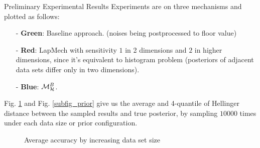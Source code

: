 \documentclass[final,hyperref={pdfpagelabels=false}]{beamer}
\begin{document}
\begin{frame}[t]
\begin{columns}[t]
\begin{column}{.485\textwidth} %






\begin{block}{Preliminary Experimental Results}
Experiments are on three mechanisms and plotted as follows:
\begin{itemize}
  \item[-] \textbf{Green}: Baseline approach. (noises being postprocessed to floor value) %
  \item[-] \textbf{Red}: LapMech with sensitivity $1$ in 2 dimensions and $2$ in higher dimensions, since it's equivalent to histogram problem 
  (posteriors of adjacent data sets differ only in two dimensions).
  \item[-] \textbf{Blue}: $\mathcal{M}^{B}_{\mathcal{H}}$.
\end{itemize}
  Fig. \ref{fig_sampling} and Fig. \ref{subfig_prior} give us the average and 4-quantile of Hellinger distance between the sampled results and true posterior, by sampling $10000$ times under each data size or prior configuration.

\begin{figure}[H]
\begin{center}
\centering
  \caption{Average accuracy by increasing data set size}
\label{fig_sampling}
\end{center}
\end{figure}


\end{block}
\end{column}
\end{columns}
\end{frame}
\end{document}
